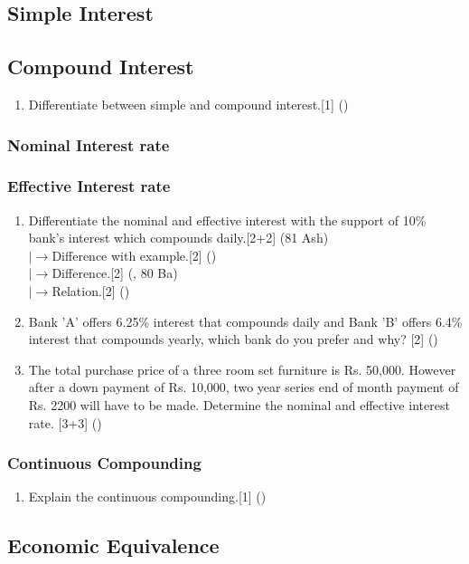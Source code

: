 \documentclass[12pt]{article}
\newcommand{\rb}{\\ $\left|\rightarrow\right.$}
\begin{document}
\subsection{Simple Interest}
\subsection{Compound Interest}
\begin{enumerate}
\item Differentiate between simple and compound interest.\hfill[1] ()
\end{enumerate}
\subsubsection{Nominal Interest rate}
\subsubsection{Effective Interest rate}
\begin{enumerate}
\item Differentiate the nominal and effective interest with the support of 10\% bank's interest which compounds daily.\hfill[2+2] (81 Ash)
\rb Difference with example.\hfill[2] ()
\rb Difference.\hfill[2] (, 80 Ba)
\rb Relation.\hfill[2] ()

\item Bank 'A' offers 6.25\% interest that compounds daily and Bank 'B' offers 6.4\% interest that compounds yearly, which bank do you prefer and why?\hspace{6.2cm} [2] ()

\item The total purchase price of a three room set furniture is Rs. 50,000. However after a down payment of Rs. 10,000, two year series end of month payment of Rs. 2200 will have to be made.  Determine the nominal and effective interest rate. \hfill [3+3] ()
\end{enumerate}
\subsubsection{Continuous Compounding}
\begin{enumerate}
\item Explain the continuous compounding.\hfill[1] ()
\end{enumerate}
\subsection{Economic Equivalence}
\end{document}
